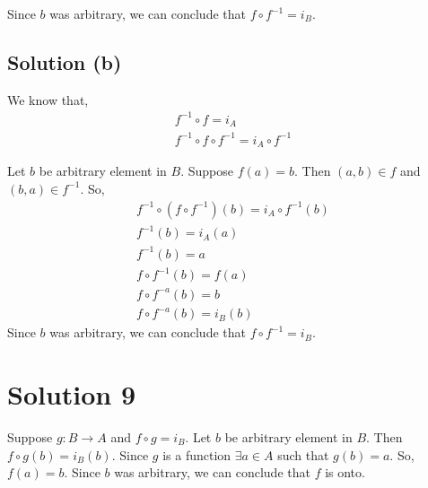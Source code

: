 \documentclass{article}
\begin{document}
Since $b$ was arbitrary, we can conclude that $f \circ f^{-1} = i_B$.

\subsection{Solution (b)}
We know that,
\begin{align*}
  f^{-1} \circ f = i_A \\
  f^{-1} \circ f \circ f^{-1} = i_A \circ f^{-1} 
\end{align*}

Let $b$ be arbitrary element in $B$. Suppose $f(a) = b$. Then $(a,b)
\in f$ and $(b,a) \in f^{-1}$. So,
\begin{align*}
  f^{-1} \circ (f \circ f^{-1})(b) = i_A \circ f^{-1}(b) \\
  f^{-1}(b) = i_A(a) \\
  f^{-1}(b) = a \\
  f \circ f^{-1}(b) = f(a) \tag{Apply f} \\
  f \circ f^{-a} (b) = b \\
  f \circ f^{-a} (b) = i_B(b)
\end{align*}
Since $b$ was arbitrary, we can conclude that $f \circ f^{-1} = i_B$.

\section{Solution 9}
Suppose $g: B \to A$ and $f \circ g = i_B$. Let $b$ be arbitrary
element in $B$. Then $f \circ g(b) = i_B(b)$. Since $g$ is a function
$\exists a \in A$ such that $g(b) = a$. So, $f(a) = b$. Since $b$ was
arbitrary, we can conclude that $f$ is onto.
\end{document}
